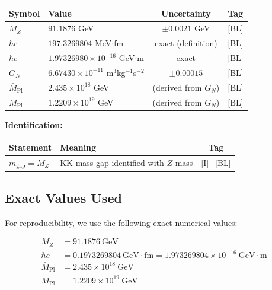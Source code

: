 \documentclass[11pt,a4paper]{article}
\newcommand{\Mpl}{M_{\mathrm{Pl}}}
\newcommand{\Mplbar}{\bar{M}_{\mathrm{Pl}}}
\newcommand{\GN}{G_N}
\newcommand{\MZ}{M_Z}
\newcommand{\mgap}{m_{\mathrm{gap}}}
\newcommand{\hbarc}{\hbar c}
\begin{document}
\begin{tcolorbox}[title=Input Parameters (Ground Truth), colback=blue!5, colframe=blue!50]
\begin{center}
\begin{tabular}{llcl}
\toprule
\textbf{Symbol} & \textbf{Value} & \textbf{Uncertainty} & \textbf{Tag} \\
\midrule
$\MZ$ & $91.1876$ GeV & $\pm 0.0021$ GeV & [BL] \\
$\hbarc$ & $197.3269804$ MeV$\cdot$fm & exact (definition) & [BL] \\
$\hbarc$ & $1.97326980 \times 10^{-16}$ GeV$\cdot$m & exact & [BL] \\
$\GN$ & $6.67430 \times 10^{-11}$ m$^3$kg$^{-1}$s$^{-2}$ & $\pm 0.00015$ & [BL] \\
$\Mplbar$ & $2.435 \times 10^{18}$ GeV & (derived from $\GN$) & [BL] \\
$\Mpl$ & $1.2209 \times 10^{19}$ GeV & (derived from $\GN$) & [BL] \\
\bottomrule
\end{tabular}
\end{center}

\textbf{Identification:}
\begin{center}
\begin{tabular}{llc}
\toprule
\textbf{Statement} & \textbf{Meaning} & \textbf{Tag} \\
\midrule
$\mgap = \MZ$ & KK mass gap identified with $Z$ mass & [I]+[BL] \\
\bottomrule
\end{tabular}
\end{center}
\end{tcolorbox}

\subsection{Exact Values Used}

For reproducibility, we use the following exact numerical values:

\begin{align}
\MZ &= 91.1876~\mathrm{GeV} \label{eq:MZ-exact}\\
\hbarc &= 0.1973269804~\mathrm{GeV \cdot fm} = 1.973269804 \times 10^{-16}~\mathrm{GeV \cdot m}
\label{eq:hbarc-exact}\\
\Mplbar &= 2.435 \times 10^{18}~\mathrm{GeV} \label{eq:Mplbar-exact}\\
\Mpl &= 1.2209 \times 10^{19}~\mathrm{GeV} \label{eq:Mpl-exact}
\end{align}
\end{document}
